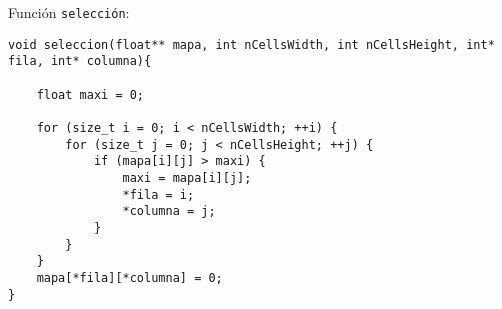 Función \texttt{selección}:
%
\begin{lstlisting}
void seleccion(float** mapa, int nCellsWidth, int nCellsHeight, int* fila, int* columna){

    float maxi = 0;

    for (size_t i = 0; i < nCellsWidth; ++i) {
        for (size_t j = 0; j < nCellsHeight; ++j) {
            if (mapa[i][j] > maxi) {
                maxi = mapa[i][j];
                *fila = i;
                *columna = j;
            }
        }
    }
    mapa[*fila][*columna] = 0;
}

\end{lstlisting}